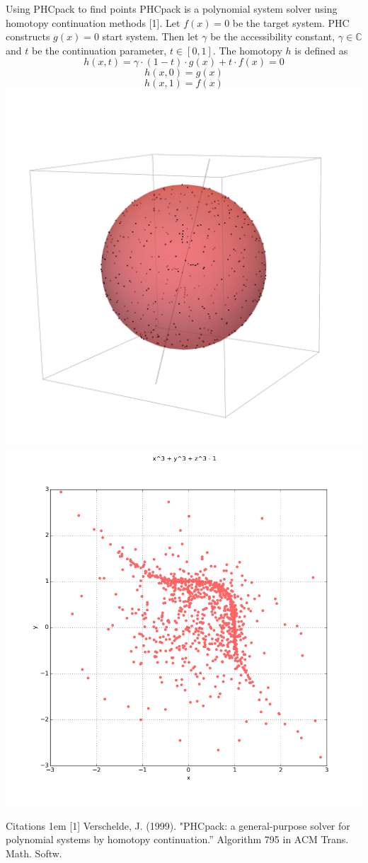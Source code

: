 \documentclass{beamer}
\def\C{\mathbb C}
\begin{document}
\begin{frame}{}
\begin{columns}[t]
\begin{column}{0.32\linewidth}
\begin{block}{Using PHCpack to find points}
PHCpack is a polynomial system solver using homotopy continuation methods [1]. Let $f(x) = 0$ be the target system. PHC constructs $g(x)=0$ start system. Then let $\gamma$ be the accessibility constant, $\gamma \in \C$ and $t$ be the continuation parameter, $t \in [0,1]$. The homotopy $h$ is defined as
\begin{equation*}
h(x,t) = \gamma \cdot (1-t)\cdot g(x) + t \cdot f(x) = 0
\end{equation*}
\begin{equation*}
h(x, 0) =g(x)
\end{equation*}
\begin{equation*}
h(x, 1) = f(x)
\end{equation*}
\includegraphics[width=.5\columnwidth]{sphere-1}
\includegraphics[width=.5\columnwidth]{plot2d_5}


\end{block}
\begin{block}{Citations}
\hangindent1em
[1] Verschelde, J. (1999). "PHCpack: a general-purpose solver for polynomial systems by homotopy continuation.'' Algorithm 795 in  ACM Trans. Math. Softw. 


\end{block}
\end{column}
\end{columns}
\end{frame}
\end{document}
